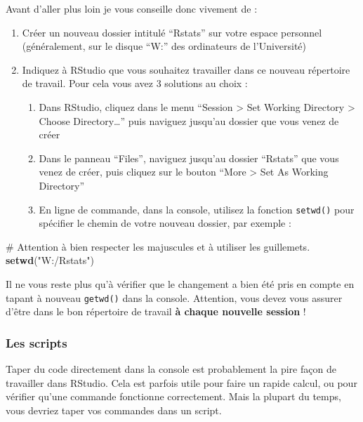 \documentclass[a4paperpaper,]{article}
\newenvironment{Shaded}{\begin{snugshade}}{\end{snugshade}}
\newcommand{\CommentTok}[1]{\textcolor[rgb]{0.54,0.53,0.53}{#1}}
\newcommand{\KeywordTok}[1]{\textcolor[rgb]{0.12,0.11,0.11}{\textbf{#1}}}
\newcommand{\NormalTok}[1]{\textcolor[rgb]{0.12,0.11,0.11}{#1}}
\newcommand{\StringTok}[1]{\textcolor[rgb]{0.75,0.01,0.01}{#1}}
\providecommand{\tightlist}{%
  \setlength{\itemsep}{0pt}\setlength{\parskip}{0pt}}
\theoremstyle{definition}
\theoremstyle{definition}
\theoremstyle{definition}
\theoremstyle{remark}
\begin{document}
Avant d'aller plus loin je vous conseille donc vivement de :

\begin{enumerate}
\def\labelenumi{\arabic{enumi}.}
\tightlist
\item
  Créer un nouveau dossier intitulé ``Rstats'' sur votre espace
  personnel (généralement, sur le disque ``W:'' des ordinateurs de
  l'Université)
\item
  Indiquez à RStudio que vous souhaitez travailler dans ce nouveau
  répertoire de travail. Pour cela vous avez 3 solutions au choix :

  \begin{enumerate}
  \def\labelenumii{\arabic{enumii}.}
  \tightlist
  \item
    Dans RStudio, cliquez dans le menu ``Session \textgreater{} Set
    Working Directory \textgreater{} Choose Directory\ldots{}'' puis
    naviguez jusqu'au dossier que vous venez de créer
  \item
    Dans le panneau ``Files'', naviguez jusqu'au dossier ``Rstats'' que
    vous venez de créer, puis cliquez sur le bouton ``More
    \textgreater{} Set As Working Directory''
  \item
    En ligne de commande, dans la console, utilisez la fonction
    \texttt{setwd()} pour spécifier le chemin de votre nouveau dossier,
    par exemple :
  \end{enumerate}
\end{enumerate}

\begin{Shaded}
\begin{Highlighting}[]
\CommentTok{# Attention à bien respecter les majuscules et à utiliser les guillemets.}
\KeywordTok{setwd}\NormalTok{(}\StringTok{"W:/Rstats"}\NormalTok{)}
\end{Highlighting}
\end{Shaded}

Il ne vous reste plus qu'à vérifier que le changement a bien été pris en
compte en tapant à nouveau \texttt{getwd()} dans la console. Attention,
vous devez vous assurer d'être dans le bon répertoire de travail
\textbf{à chaque nouvelle session} !

\hypertarget{les-scripts}{%
\subsubsection{Les scripts}\label{les-scripts}}

Taper du code directement dans la console est probablement la pire façon
de travailler dans RStudio. Cela est parfois utile pour faire un rapide
calcul, ou pour vérifier qu'une commande fonctionne correctement. Mais
la plupart du temps, vous devriez taper vos commandes dans un script.
\end{document}
